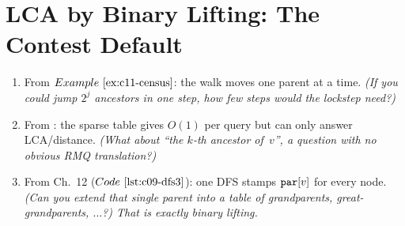 \section{LCA by Binary Lifting: The Contest Default}\label{sec:c11-lifting}

\begin{previouslybox}
\begin{enumerate}[nosep, leftmargin=1.8em]
  \item From \(\exref{c11-census}\): the walk moves one parent at a time.
        \emph{(If you could jump \(2^j\) ancestors in one step, how few
        steps would the lockstep need?)}
  \item From : the sparse table gives \(O(1)\) per query
        but can only answer LCA/distance.  \emph{(What about ``the
        \(k\)-th ancestor of~\(v\)'', a question with no obvious RMQ
        translation?)}
  \item From Ch.~12 (\(\coderef{c09-dfs3}\)): one DFS stamps \(\texttt{par}[v]\)
        for every node.  \emph{(Can you extend that single parent into a
        \emph{table} of grandparents, great-grandparents, \(\dots\)?)
        That is exactly binary lifting.}
\end{enumerate}
\end{previouslybox}


